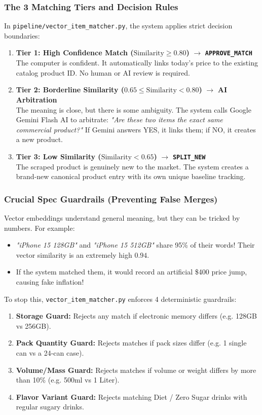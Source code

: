 \documentclass[11pt,a4paper,oneside]{article}
\begin{document}
\subsubsection{The 3 Matching Tiers and Decision Rules}
In \texttt{pipeline/vector\_item\_matcher.py}, the system applies strict decision boundaries:
\begin{enumerate}
    \item \textbf{Tier 1: High Confidence Match ($\text{Similarity} \ge 0.80$)} $\rightarrow$ \textbf{\texttt{APPROVE\_MATCH}}\\
    The computer is confident. It automatically links today's price to the existing catalog product ID. No human or AI review is required.
    \item \textbf{Tier 2: Borderline Similarity ($0.65 \le \text{Similarity} < 0.80$)} $\rightarrow$ \textbf{AI Arbitration}\\
    The meaning is close, but there is some ambiguity. The system calls Google Gemini Flash AI to arbitrate: \textit{"Are these two items the exact same commercial product?"} If Gemini answers YES, it links them; if NO, it creates a new product.
    \item \textbf{Tier 3: Low Similarity ($\text{Similarity} < 0.65$)} $\rightarrow$ \textbf{\texttt{SPLIT\_NEW}}\\
    The scraped product is genuinely new to the market. The system creates a brand-new canonical product entry with its own unique baseline tracking.
\end{enumerate}

\subsubsection{Crucial Spec Guardrails (Preventing False Merges)}
Vector embeddings understand general meaning, but they can be tricked by numbers. For example:
\begin{itemize}
    \item \textit{"iPhone 15 128GB"} and \textit{"iPhone 15 512GB"} share 95\% of their words! Their vector similarity is an extremely high $0.94$.
    \item If the system matched them, it would record an artificial \$400 price jump, causing fake inflation!
\end{itemize}
To stop this, \texttt{vector\_item\_matcher.py} enforces 4 deterministic guardrails:
\begin{enumerate}
    \item \textbf{Storage Guard:} Rejects any match if electronic memory differs (e.g. 128GB vs 256GB).
    \item \textbf{Pack Quantity Guard:} Rejects matches if pack sizes differ (e.g. 1 single can vs a 24-can case).
    \item \textbf{Volume/Mass Guard:} Rejects matches if volume or weight differs by more than 10\% (e.g. 500ml vs 1 Liter).
    \item \textbf{Flavor Variant Guard:} Rejects matching Diet / Zero Sugar drinks with regular sugary drinks.
\end{enumerate}
\end{document}
